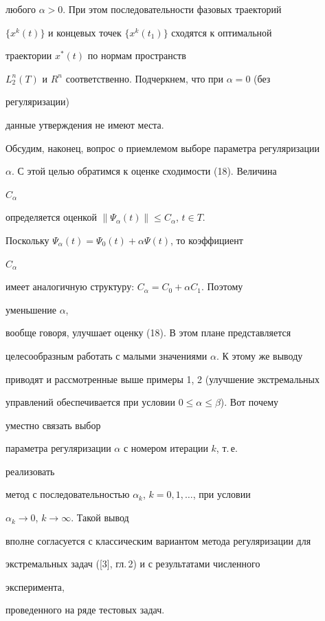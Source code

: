 любого $\alpha>0$. При этом последовательности фазовых траекторий 


$\{x^k(t)\}$ и концевых точек $\{x^k(t_1)\}$ сходятся к оптимальной 


траектории $x^*(t)$ по нормам пространств 


$L^n_2(T)$ и $R^n$ соответственно. Подчеркнем, что при $\alpha=0$ (без 


регуляризации) 


данные утверждения не имеют места. 


 


Обсудим, наконец, вопрос о приемлемом выборе параметра регуляризации 


$\alpha$. С этой целью обратимся к оценке сходимости (18). Величина 


$C_\alpha$ 


определяется оценкой $\|\Psi_\alpha(t)\|\le C_\alpha$, $t\in T$. 


Поскольку $\Psi_\alpha(t)=\Psi_0(t)+\alpha\Psi(t)$, то коэффициент 


$C_\alpha$ 


имеет аналогичную структуру: $C_\alpha=C_0+\alpha C_1$. Поэтому 


уменьшение $\alpha$, 


вообще говоря, улучшает оценку (18). В этом плане представляется 


целесообразным работать с малыми значениями $\alpha$. К этому же выводу 


приводят и рассмотренные выше примеры 1, 2 (улучшение экстремальных 


управлений обеспечивается при условии $0\le\alpha\le\beta$). Вот почему 


уместно связать выбор 


параметра регуляризации $\alpha$ с номером итерации $k$, т.\,е.{} 


реализовать 


метод с последовательностью $\alpha_k$, $k=0,1,\dotsc$, при условии 


$\alpha_k\to 0$, $k\to\infty$. Такой вывод 


вполне согласуется с классическим вариантом метода регуляризации для 


экстремальных задач ([3], гл.\,2) и с результатами численного 


эксперимента, 


проведенного на ряде тестовых задач. 


